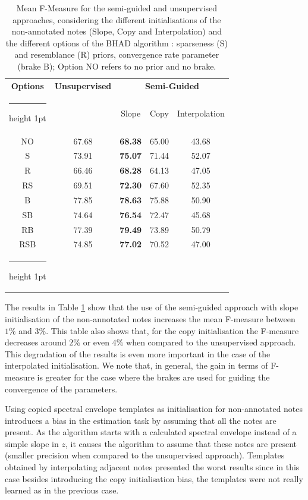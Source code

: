 \documentclass{article}
\makeatletter
\newcommand{\thickhline}{%
    \noalign {\ifnum 0=`}\fi \hrule height 1pt
    \futurelet \reserved@a \@xhline
}
\makeatother
\begin{document}
\begin{table}[htb]
\begin{tabular}{ccccc}
\hline
\textbf{Options} & \textbf{Unsupervised} & \multicolumn{3}{c}{\textbf{Semi-Guided}} \\\thickhline
 & & Slope & Copy & Interpolation \\\hline
 NO  & 67.68 &	 \textbf{68.38} &	 65.00 &	 43.68 \\
 S   & 73.91 &     \textbf{75.07} &	 71.44 &	 52.07 \\
 R   & 66.46 &	 \textbf{68.28} &	 64.13 &	 47.05 \\
 RS  & 69.51 &	 \textbf{72.30} &	 67.60 &	 52.35 \\ \hline
 B   & 77.85 &	 \textbf{78.63} &	 75.88 &	 50.90 \\
 SB  & 74.64 &	 \textbf{76.54} &	 72.47 &	 45.68 \\
 RB  & 77.39 &	 \textbf{79.49} &	 73.89 &	 50.79 \\
 RSB & 74.85 &	 \textbf{77.02} &	 70.52 & 	 47.00  \\\thickhline
\end{tabular}
\caption{Mean F-Measure for the semi-guided and unsupervised approaches, considering the different initialisations of the non-annotated notes (Slope, Copy and Interpolation) and the different options of the BHAD algorithm : sparseness (S) and resemblance (R) priors, convergence rate parameter (brake B); Option NO refers to no prior and no brake.}
\label{tab:init}
\end{table}


The results in Table \ref{tab:init} show that the use of the semi-guided approach with slope initialisation of the non-annotated notes increases the mean F-measure between $1\%$ and $3\%$. This table also shows that, for the copy initialisation the F-measure decreases around $2\%$ or even $4\%$ when compared to the unsupervised approach. This degradation of the results is even more important in the case of the interpolated initialisation. We note that, in general, the gain in terms of F-measure is greater for the case where the brakes are used for guiding the convergence of the parameters.

Using copied spectral envelope templates as initialisation for non-annotated notes introduces a bias in the estimation task by assuming that all the notes are present. As the algorithm starts with a calculated spectral envelope instead of a simple slope in $z$, it causes the algorithm to assume that these notes are present (smaller precision when compared to the unsupervised approach). Templates obtained by interpolating adjacent notes presented the worst results since in this case besides introducing the copy initialisation bias, the templates were not really learned as in the previous case.
\end{document}
